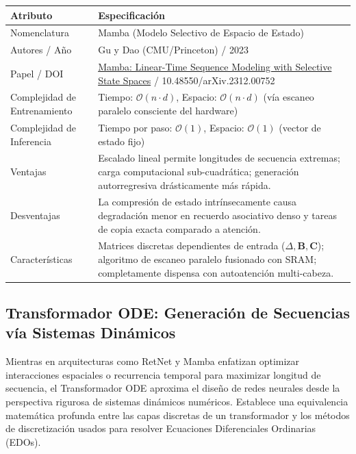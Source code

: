 \documentclass[11pt,a4paper]{article}
\begin{document}
\begin{center}
\begin{tabular}{|l|p{11cm}|}
\hline
\textbf{Atributo} & \textbf{Especificación} \\
\hline
Nomenclatura & Mamba (Modelo Selectivo de Espacio de Estado) \\
\hline
Autores / Año & Gu y Dao (CMU/Princeton) / 2023 \\
\hline
Papel / DOI & \href{https://arxiv.org/abs/2312.00752}{Mamba: Linear-Time Sequence Modeling with Selective State Spaces} / 10.48550/arXiv.2312.00752 \\
\hline
Complejidad de Entrenamiento & Tiempo: $\mathcal{O}(n \cdot d)$, Espacio: $\mathcal{O}(n \cdot d)$ (vía escaneo paralelo consciente del hardware) \\
\hline
Complejidad de Inferencia & Tiempo por paso: $\mathcal{O}(1)$, Espacio: $\mathcal{O}(1)$ (vector de estado fijo) \\
\hline
Ventajas & Escalado lineal permite longitudes de secuencia extremas; carga computacional sub-cuadrática; generación autorregresiva drásticamente más rápida. \\
\hline
Desventajas & La compresión de estado intrínsecamente causa degradación menor en recuerdo asociativo denso y tareas de copia exacta comparado a atención. \\
\hline
Características & Matrices discretas dependientes de entrada ($\Delta, \mathbf{B}, \mathbf{C}$); algoritmo de escaneo paralelo fusionado con SRAM; completamente dispensa con autoatención multi-cabeza. \\
\hline
\end{tabular}
\end{center}

\subsection{Transformador ODE: Generación de Secuencias vía Sistemas Dinámicos}
\label{subsec:ode_transformer}

Mientras en arquitecturas como RetNet y Mamba enfatizan optimizar interacciones espaciales o recurrencia temporal para maximizar longitud de secuencia, el Transformador ODE aproxima el diseño de redes neurales desde la perspectiva rigurosa de sistemas dinámicos numéricos. Establece una equivalencia matemática profunda entre las capas discretas de un transformador y los métodos de discretización usados para resolver Ecuaciones Diferenciales Ordinarias (EDOs).
\end{document}
